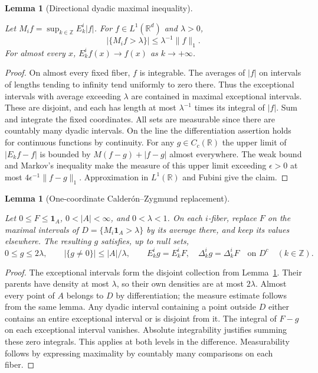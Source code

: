 \documentclass[11pt,letterpaper]{article}
\newtheorem{lemma}[theorem]{Lemma}
\theoremstyle{definition}
\newcommand{\R}{\mathbb R}
\newcommand{\ind}{\mathbf1}
\newcommand{\norm}[1]{\lVert#1\rVert}
\providecommand{\lean}[1]{}
\providecommand{\uses}[1]{}
\begin{document}
\begin{lemma}[Directional dyadic maximal inequality]\label{bp:dyadic-max}
\lean{TwistedParaproduct.dyadicMax}
Let \(M_i f=\sup_{k\in\mathbb Z}E_k^i|f|\). For \(f\in L^1(\R^d)\)
and \(\lambda>0\),
\[
          |\{M_i f>\lambda\}|\le \lambda^{-1}\norm{f}_1 .
\]
For almost every \(x\), \(E_k^i f(x)\to f(x)\) as \(k\to+\infty\).
\end{lemma}
\begin{proof}
On almost every fixed fiber, \(f\) is integrable. The averages of
\(|f|\) on intervals of lengths tending to infinity tend uniformly to
zero there. Thus the exceptional intervals with average exceeding
\(\lambda\) are contained in maximal exceptional intervals. These
are disjoint, and each has length at most \(\lambda^{-1}\) times its
integral of \(|f|\). Sum and integrate the fixed coordinates. All sets
are measurable since there are countably many dyadic intervals.
On the line the differentiation assertion holds for continuous functions
by continuity. For any \(g\in C_c(\R)\) the upper limit of
\(|E_k f-f|\) is bounded by \(M(f-g)+|f-g|\) almost everywhere.
The weak bound and Markov's inequality make the measure of this
upper limit exceeding \(\epsilon>0\) at most
\(4\epsilon^{-1}\norm{f-g}_1\). Approximation in \(L^1(\R)\)
and Fubini give the claim.
\end{proof}

\begin{lemma}[One-coordinate Calder\'on--Zygmund replacement]\label{bp:dyadic-cz}
\lean{TwistedParaproduct.dyadicCz}
Let \(0\le F\le\ind_A\), \(0<|A|<\infty\), and \(0<\lambda<1\).
On each \(i\)-fiber, replace \(F\) on the maximal intervals of
\(D=\{M_i\ind_A>\lambda\}\) by its average there, and keep its values
elsewhere. The resulting \(g\) satisfies, up to null sets,
\[
 0\le g\le 2\lambda,\qquad |\{g\ne0\}|\le |A|/\lambda,\qquad
 E_k^i g=E_k^i F,\quad\Delta_k^i g=\Delta_k^i F
                 \quad\text{on }D^c\quad(k\in\mathbb Z).
\]
\end{lemma}
\begin{proof}
\uses{bp:dyadic-max}
The exceptional intervals form the disjoint collection from
Lemma~\ref{bp:dyadic-max}. Their parents have density at most
\(\lambda\), so their own densities are at most \(2\lambda\).
Almost every point of \(A\) belongs to \(D\) by differentiation;
the measure estimate follows from the same lemma. Any dyadic
interval containing a point outside \(D\) either contains an entire
exceptional interval or is disjoint from it. The integral of \(F-g\)
on each exceptional interval vanishes. Absolute integrability
justifies summing these zero integrals. This applies at both levels
in the difference. Measurability follows by expressing maximality by
countably many comparisons on each fiber.
\end{proof}
\end{document}
